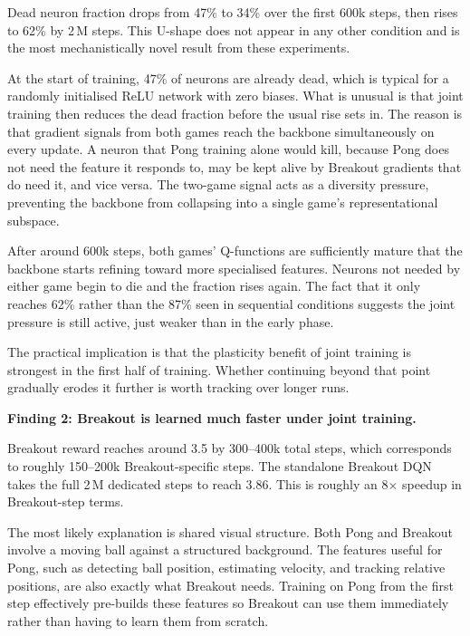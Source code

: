 \documentclass[11pt,a4paper]{article}
\begin{document}
\begin{insight}
Dead neuron fraction drops from 47\% to 34\% over the first 600k steps, then rises to
62\% by 2\,M steps. This U-shape does not appear in any other condition and is the most
mechanistically novel result from these experiments.
\end{insight}

At the start of training, 47\% of neurons are already dead, which is typical for a
randomly initialised ReLU network with zero biases. What is unusual is that joint training
then reduces the dead fraction before the usual rise sets in. The reason is that gradient
signals from both games reach the backbone simultaneously on every update. A neuron that
Pong training alone would kill, because Pong does not need the feature it responds to,
may be kept alive by Breakout gradients that do need it, and vice versa. The two-game
signal acts as a diversity pressure, preventing the backbone from collapsing into a single
game's representational subspace.

After around 600k steps, both games' Q-functions are sufficiently mature that the backbone
starts refining toward more specialised features. Neurons not needed by either game begin
to die and the fraction rises again. The fact that it only reaches 62\% rather than the
87\% seen in sequential conditions suggests the joint pressure is still active, just weaker
than in the early phase.

The practical implication is that the plasticity benefit of joint training is strongest
in the first half of training. Whether continuing beyond that point gradually erodes it
further is worth tracking over longer runs.

\textbf{Finding 2: Breakout is learned much faster under joint training.}

Breakout reward reaches around 3.5 by 300--400k total steps, which corresponds to roughly
150--200k Breakout-specific steps. The standalone Breakout DQN takes the full 2\,M
dedicated steps to reach 3.86. This is roughly an 8$\times$ speedup in Breakout-step
terms.

The most likely explanation is shared visual structure. Both Pong and Breakout involve a
moving ball against a structured background. The features useful for Pong, such as detecting
ball position, estimating velocity, and tracking relative positions, are also exactly what
Breakout needs. Training on Pong from the first step effectively pre-builds these features
so Breakout can use them immediately rather than having to learn them from scratch.
\end{document}
